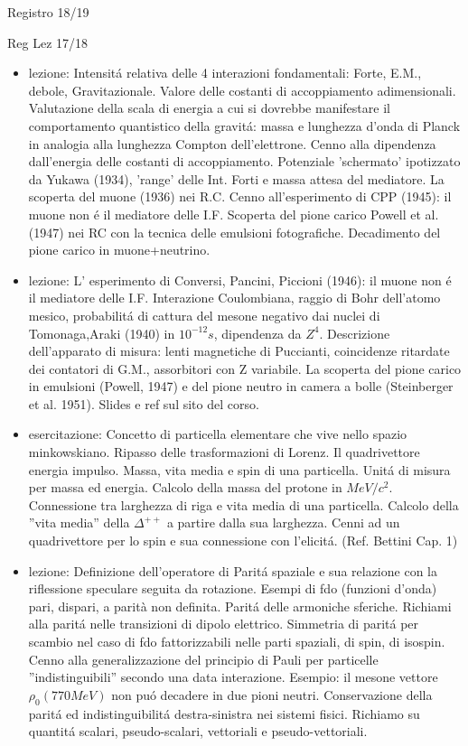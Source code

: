 \begin{frame}{Registro 18/19}
\begin{frame}[allowframebreaks]{Reg Lez 17/18}
\begin{itemize}
\item lezione: Intensit\'a relativa delle 4 interazioni fondamentali: Forte, E.M., debole, Gravitazionale. Valore delle costanti di accoppiamento adimensionali. Valutazione della scala di energia a cui si dovrebbe manifestare il comportamento quantistico della gravit\'a: massa e lunghezza d'onda di Planck in analogia alla lunghezza Compton dell'elettrone. Cenno alla dipendenza dall'energia delle costanti di accoppiamento. Potenziale 'schermato' ipotizzato da Yukawa (1934), 'range' delle Int. Forti e massa attesa del mediatore. La scoperta del muone (1936) nei R.C. Cenno all'esperimento di CPP (1945): il muone non \'e il mediatore delle I.F. Scoperta del pione carico Powell et al. (1947) nei RC con la tecnica delle emulsioni fotografiche. Decadimento del pione carico in muone+neutrino.

\item lezione: L' esperimento di Conversi, Pancini, Piccioni (1946): il muone non \'e il mediatore delle I.F. Interazione Coulombiana, raggio di Bohr dell'atomo mesico, probabilit\'a di cattura del mesone negativo dai nuclei di Tomonaga,Araki (1940) in $10^{-12}s$, dipendenza da $Z^4$. Descrizione dell'apparato di misura: lenti magnetiche di Puccianti, coincidenze ritardate dei contatori di G.M., assorbitori con Z variabile. La scoperta del pione carico in emulsioni (Powell, 1947) e del pione neutro in camera a bolle (Steinberger et al. 1951). Slides e ref sul sito del corso.

\item esercitazione: Concetto di particella elementare che vive nello spazio minkowskiano. Ripasso delle trasformazioni di Lorenz. Il quadrivettore energia impulso. Massa, vita media e spin di una particella. Unit\'a di misura per massa ed energia. Calcolo della massa del protone in $MeV/c^2$. Connessione tra larghezza di riga e vita media di una particella. Calcolo della ''vita media'' della $\Delta^{++}$ a partire dalla sua larghezza. Cenni ad un quadrivettore per lo spin e sua connessione con l'elicit\'a. (Ref. Bettini Cap. 1) 

\item lezione: Definizione dell'operatore di Parit\'a spaziale e sua relazione con la riflessione speculare seguita da rotazione. Esempi di fdo (funzioni d'onda) pari, dispari, a parità non definita.  Parit\'a delle armoniche sferiche. Richiami alla parit\'a nelle transizioni di dipolo elettrico. Simmetria di  parit\'a per scambio nel caso di fdo fattorizzabili nelle parti spaziali, di spin, di isospin. Cenno alla generalizzazione del principio di Pauli per particelle ''indistinguibili'' secondo una data interazione. Esempio: il mesone vettore $\rho_0(770 MeV)$ non pu\'o decadere in due pioni neutri. Conservazione della parit\'a ed indistinguibilit\'a destra-sinistra nei sistemi fisici. Richiamo su quantit\'a scalari, pseudo-scalari, vettoriali e pseudo-vettoriali.


\end{itemize}
\end{frame}
\end{frame}
